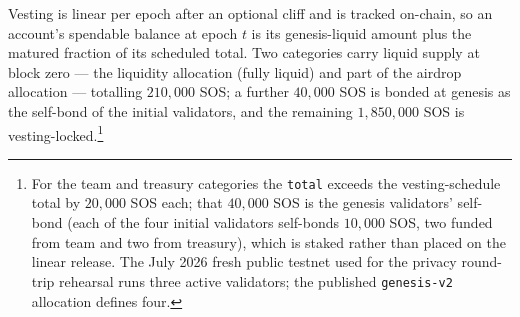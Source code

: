 \documentclass[11pt]{article}
\newcommand{\code}[1]{\texttt{#1}}
\theoremstyle{plain}
\theoremstyle{definition}
\theoremstyle{remark}
\begin{document}
\begin{center}
\end{center}

Vesting is linear per epoch after an optional cliff and is tracked on-chain, so
an account's spendable balance at epoch $t$ is its genesis-liquid amount plus
the matured fraction of its scheduled total. Two categories carry liquid supply
at block zero --- the liquidity allocation (fully liquid) and part of the
airdrop allocation --- totalling $210{,}000$ SOS; a further $40{,}000$ SOS is
bonded at genesis as the self-bond of the initial validators, and the remaining
$1{,}850{,}000$ SOS is vesting-locked.\footnote{For the team and treasury
categories the \code{total} exceeds the vesting-schedule total by $20{,}000$
SOS each; that $40{,}000$ SOS is the genesis validators' self-bond (each of the
four initial validators self-bonds $10{,}000$ SOS, two funded from team and two
from treasury), which is staked rather than placed on the linear release. The
July 2026 fresh public testnet used for the privacy round-trip rehearsal runs
three active validators; the published \code{genesis-v2} allocation defines
four.}
\end{document}
